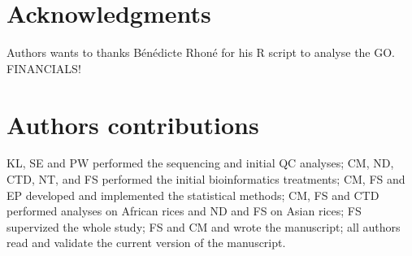 \documentclass[10pt,letterpaper]{article}
\begin{document}
% 

\section*{Acknowledgments}
Authors wants to thanks Bénédicte Rhoné for his R script to analyse the GO.
FINANCIALS!


\section*{Authors contributions}
KL, SE and PW performed the sequencing and initial QC analyses; CM, ND, CTD, NT, and FS performed the initial bioinformatics treatments; CM, FS and EP developed and implemented the statistical methods; CM, FS and CTD performed analyses on African rices and ND and FS on Asian rices; FS supervized the whole study; FS and CM and wrote the manuscript; all authors read and validate the current version of the manuscript.


\nolinenumbers
\end{document}
